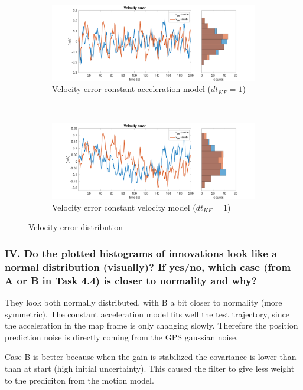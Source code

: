 \documentclass{article}
\begin{document}
\begin{figure}[H]
    \begin{subfigure}[t]{0.49\textwidth}
        \centering
        \includegraphics[width=\textwidth]{dt1/velocity_error}
        \caption{Velocity error constant acceleration model ($dt_{KF} = 1$)}
    \end{subfigure}
    ~
    \begin{subfigure}[t]{0.49\textwidth}
        \centering
        \includegraphics[width=\textwidth]{dt1vconst/velocity_error}
        \caption{Velocity error constant velocity model ($dt_{KF} = 1$)}
    \end{subfigure}
    \caption{Velocity error distribution}
    \label{fig:traj_motion_noise}
\end{figure}

\subsubsection*{IV. Do the plotted histograms of innovations look like a normal distribution (visually)?
If yes/no, which case (from A or B in Task 4.4) is closer to normality and why?}

They look both normally distributed, with B a bit closer to normality (more symmetric).
The constant acceleration model fits well the test trajectory, since the acceleration in the map frame is only changing slowly.
Therefore the position prediction noise is directly coming from the GPS gaussian noise.

Case B is better because when the gain is stabilized the covariance is lower than than at start (high initial uncertainty).
This caused the filter to give less weight to the prediciton from the motion model.
\end{document}
